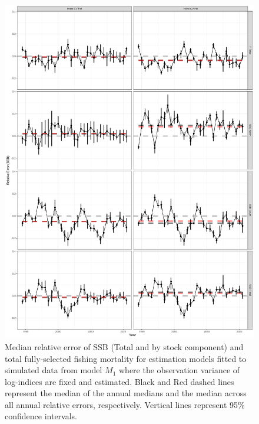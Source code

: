 \documentclass[
]{article}
\begin{document}
\begin{figure}

{\centering \includegraphics[width=1\linewidth]{self_test_results} 

}

\caption{Median relative error of SSB (Total and by stock component) and total fully-selected fishing mortality for estimation models fitted to simulated data from model $M_1$ where the observation variance of log-indices are fixed and estimated. Black and Red dashed lines represent the median of the annual medians and the median across all annual relative errors, respectively. Vertical lines represent 95\% confidence intervals.}\label{fig:self-test-fig}
\end{figure}
\end{document}
